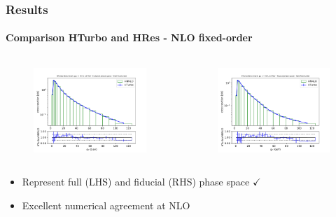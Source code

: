 \documentclass[aspectratio=43]{beamer}
\begin{document}
\begin{frame}
	
	\frametitle{Results}
	\framesubtitle{Comparison HTurbo and HRes - NLO fixed-order}
	
	\begin{columns}
		
		
		\begin{figure}
			\includegraphics[width = 7cm]{plots/part3/chapter6/nnlo-fo-1.png}
		\end{figure}
		
		
		\begin{figure}
			\includegraphics[width = 7cm]{plots/part3/chapter6/nnlo-fo-fid-1.png}
		\end{figure}
		
	\end{columns}
	
	\begin{itemize}
		\item \footnotesize Represent full (LHS) and fiducial (RHS) phase space {\color{darkgreen}$\checkmark$} 
		\item \footnotesize Excellent numerical agreement at NLO
	\end{itemize}

\end{frame}
\end{document}
